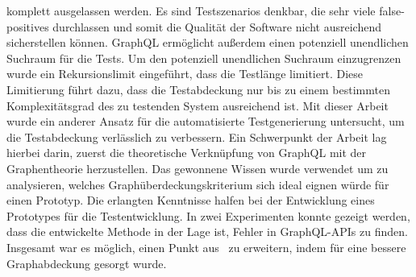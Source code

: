 komplett ausgelassen werden.
Es sind Testszenarios denkbar, die sehr viele false-positives durchlassen und somit die Qualität der Software nicht ausreichend sicherstellen können.
GraphQL ermöglicht außerdem einen potenziell unendlichen Suchraum für die Tests.
Um den potenziell unendlichen Suchraum einzugrenzen wurde ein Rekursionslimit eingeführt, dass die Testlänge limitiert.
Diese Limitierung führt dazu, dass die Testabdeckung nur bis zu einem bestimmten Komplexitätsgrad des zu testenden System ausreichend ist.
Mit dieser Arbeit wurde ein anderer Ansatz für die automatisierte Testgenerierung untersucht, um die Testabdeckung verlässlich zu verbessern.
Ein Schwerpunkt der Arbeit lag hierbei darin, zuerst die theoretische Verknüpfung von GraphQL mit der Graphentheorie herzustellen.
Das gewonnene Wissen wurde verwendet um zu analysieren, welches Graphüberdeckungskriterium sich ideal eignen würde für einen Prototyp.
Die erlangten Kenntnisse halfen bei der Entwicklung eines Prototypes für die Testentwicklung.
In zwei Experimenten konnte gezeigt werden, dass die entwickelte Methode in der Lage ist, Fehler in GraphQL-APIs zu finden.
Insgesamt war es möglich, einen Punkt aus~\cite[VI. Future Work]{property-based-testing} zu erweitern, indem für eine bessere Graphabdeckung gesorgt wurde.






